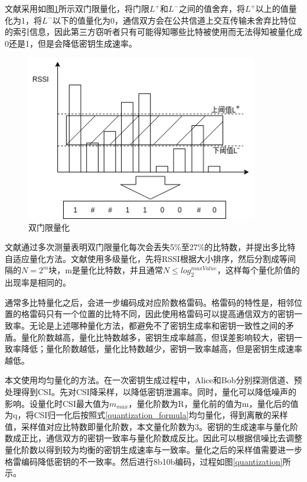\documentclass[master]{seuthesis} %
\begin{document}
\begin{Main}
文献\citet{mathur2008radio}采用如图\ref{two_quantization}所示双门限量化，将门限$L^+$和$L^-$之间的值舍弃，将$L^+$以上的值量化为1，将$L^-$以下的值量化为0，通信双方会在公共信道上交互传输未舍弃比特位的索引信息，因此第三方窃听者只有可能得知哪些比特被使用而无法得知被量化成0还是1，但是会降低密钥生成速率。

\begin{figure}[htbp!]
    \centering \includegraphics[width=0.9\textwidth]{images/two_quantization} 
    \caption{双门限量化}
    \label{two_quantization}
\end{figure}

文献\citet{patwari2009high}通过多次测量表明双门限量化每次会丢失5\%至27\%的比特数，并提出多比特自适应量化方法。文献\citet{yasukawa2008secret}使用多级量化，先将RSSI根据大小排序，然后分割成等间隔的$N = 2^m$块，m是量化比特数，并且通常$N \leq log_2^{maxValue}$，这样每个量化阶值的出现率是相同的。

通常多比特量化之后，会进一步编码成对应阶数格雷码。格雷码的特性是，相邻位置的格雷码只有一个位置的比特不同，因此使用格雷码可以提高通信双方的密钥一致率。无论是上述哪种量化方法，都避免不了密钥生成率和密钥一致性之间的矛盾。量化阶数越高，量化比特数越多，密钥生成率越高，但误差影响较大，密钥一致率降低；量化阶数越低，量化比特数越少，密钥一致率越高，但是密钥生成速率越低。

本文使用均匀量化的方法。在一次密钥生成过程中，Alice和Bob分别探测信道、预处理得到CSI。先对CSI降采样，以降低密钥泄漏率\cite{linning2019investigation}。同时，量化可以降低噪声的影响\cite{wang2015survey}。设量化时CSI最大值为$m_{max}$，量化阶数为R，量化前的值为m，量化后的值为q，将CSI归一化后按照式\ref{quantization_formula}均匀量化，得到离散的采样值，采样值对应比特数即量化阶数，本文量化阶数为3。密钥的生成速率与量化阶数成正比，通信双方的密钥一致率与量化阶数成反比。因此可以根据信噪比去调整量化阶数以得到较为均衡的密钥生成速率与一致率。量化之后的采样值需要进一步格雷编码降低密钥的不一致率。然后进行8b10b编码，过程如图\ref{quantization}所示。


\end{Main}
\end{document}
